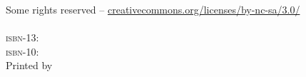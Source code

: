 %

\frontmatter
\pagestyle{titlestyle}
\hypersetup{pageanchor=false}
\setlrmarginsandblock{2cm}{2cm}{*}
\setulmarginsandblock{2cm}{2cm}{*}
\checkandfixthelayout
\makeatletter
\ch@ngetext
\makeatletter
\clearpage




\cleardoublepage


\vspace*{\fill}
\begin{center}
{
  {\Huge \thesistitle }\\[0.5cm]
  {\huge ~\thesissubtitle~ }\\
}
\end{center}
\vspace*{\fill}
\vspace*{\fill}
\clearpage

\vspace*{\fill}
\ccbyncsa\ \thesisyear\ \thesisauthor\\
Some rights reserved -- \url{creativecommons.org/licenses/by-nc-sa/3.0/}\\

\thesisonline\\

\textsc{isbn-13}: \href{http://www.google.com/?q=\thesisisbna}{\thesisisbna}\\
\textsc{isbn-10}: \href{http://www.google.com/?q=\thesisisbnb}{\thesisisbnb}\\

\ifdefined\thesisprinter
Printed by \thesisprinter
\fi

\thesisprintdetails\\

